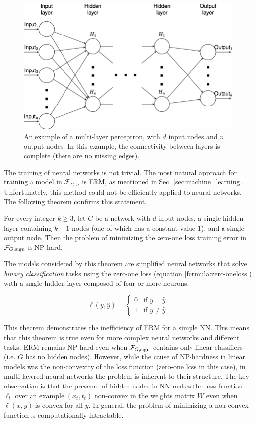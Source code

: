 \begin{figure}[h!]
	\centering
	\includegraphics[width=0.85\linewidth]{images/mlp.png}
	\caption{An example of a multi-layer perceptron, with $d$ input nodes and $n$ output nodes. In this example, the connectivity between layers is complete (there are no missing edges).}
\end{figure}

The training of neural networks is not trivial. The most natural approach for training a model in $\mathcal{F}_{G,\sigma}$ is ERM, as mentioned in Sec. \ref{sec:machine_learning}.
Unfortunately, this method could not be efficiently applied to neural networks. The following theorem confirms this statement.

\begin{theorem}
	For every integer $k \geq 3$, let $G$ be a network with $d$ input nodes, a single hidden layer containing $k + 1$ nodes (one of which has a constant value 1), and a single output node. Then the problem of minimizing the zero-one loss training error in $\mathcal{F}_{G,\operatorname{sign}}$ is NP-hard. 
\end{theorem}

The models considered by this theorem are simplified neural networks that solve \textit{binary classification} tasks using the zero-one loss (equation \ref{formula:zero-oneloss}) with a single hidden layer composed of four or more neurons. 

\begin{equation}
\label{formula:zero-oneloss}
\ell(y, \hat y) = 
\begin{cases}
0 & \text{if $y = \hat y$} \\
1 & \text{if $y \neq \hat y$}
\end{cases}
\end{equation}

This theorem demonstrates the inefficiency of ERM for a simple NN. This means that this theorem is true even for more complex neural networks and different tasks. ERM remains NP-hard even when $\mathcal{F}_{G,\operatorname{sign}}$ contains only linear classifiers (i.e. $G$ has no hidden nodes). However, while the cause of NP-hardness in linear models was the non-convexity of the loss function (zero-one loss in this case), in multi-layered neural networks the problem is inherent to their structure. The key observation is that the presence of hidden nodes in NN makes the loss function $\ell_t$ over an example $(x_t, t_t)$ non-convex in the weights matrix $W$ even when $\ell(x, y)$ is convex for all $y$. In general, the problem of minimizing a non-convex function is computationally intractable.  

